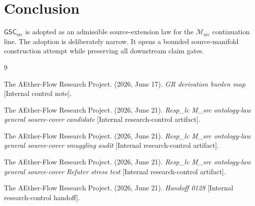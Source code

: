 \documentclass[11pt]{article}
\newcommand{\Msrc}{\mathcal{M}_{\mathrm{src}}}
\newcommand{\GSC}{\mathsf{GSC}_{\mathrm{src}}}
\begin{document}
\section{Conclusion}

\(\GSC\) is adopted as an admissible source-extension law for the
\(\Msrc\) continuation line. The adoption is deliberately narrow. It opens a
bounded source-manifold construction attempt while preserving all downstream
claim gates.

\begin{thebibliography}{9}

The AEther-Flow Research Project. (2026, June 17). \emph{GR derivation
burden map} [Internal control note].

The AEther-Flow Research Project. (2026, June 21). \emph{Resp\_lc M\_src
ontology-law general source-cover candidate}
[Internal research-control artifact].

The AEther-Flow Research Project. (2026, June 21). \emph{Resp\_lc M\_src
ontology-law general source-cover smuggling audit}
[Internal research-control artifact].

The AEther-Flow Research Project. (2026, June 21). \emph{Resp\_lc M\_src
ontology-law general source-cover Refuter stress test}
[Internal research-control artifact].

The AEther-Flow Research Project. (2026, June 21). \emph{Handoff 0128}
[Internal research-control handoff].

\end{thebibliography}
\end{document}
